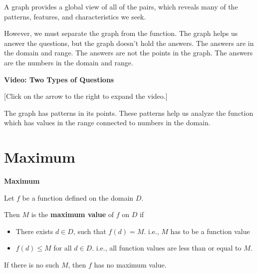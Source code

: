 \documentclass{ximera}
\begin{document}
A graph provides a global view of all of the pairs, which reveals many of the patterns, features, and characteristics we seek.   

However, we must separate the graph from the function.  The graph helps us answer the questions, but the graph doesn't hold the answers.  The answers are in the domain and range.  The answers are not the points in the graph.  The answers are the numbers in the domain and range.






\begin{explanation} \textbf{Video: Two Types of Questions}

[Click on the arrow to the right to expand the video.]
\begin{expandable} 

\begin{center}
\end{center}

\end{expandable}
\end{explanation}








The graph has patterns in its points.  These patterns help us analyze the function which has values in the range connected to numbers in the domain.




\section{Maximum}



\begin{definition} \textbf{\textcolor{green!50!black}{Maximum}} 


Let $f$ be a function defined on the domain $D$.

Then $M$ is the \textbf{maximum value} of $f$ on $D$ if    


\begin{itemize}
\item There exists $d \in D$, such that $f(d) = M$.   i.e., $M$ has to be a function value \\

\item $f(d) \leq M$ for all $d \in D$. i.e., all function values are less than or equal to $M$. 

\end{itemize}


If there is no such $M$, then $f$ has no maximum value.

\end{definition}
\end{document}
